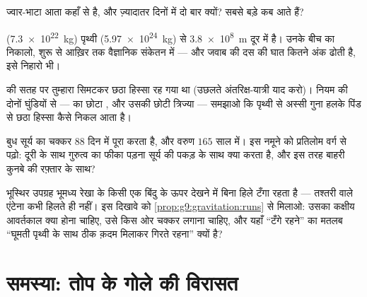 \begin{exercise}[$\star$]\label{exo:g9:gravitation:8}
ज्वार-भाटा आता कहाँ से है, और ज़्यादातर दिनों में दो बार क्यों? सबसे
बड़े कब आते हैं?
\end{exercise}

\begin{exercise}[$\star\star$]\label{exo:g9:gravitation:9}
 (\qty{7.3e22}{kg}) पृथ्वी (\qty{5.97e24}{kg}) से
\qty{3.8e8}{m} दूर  में है। उनके बीच का  निकालो, शुरू से
आख़िर तक वैज्ञानिक संकेतन में --- और जवाब की दस की घात कितने अंक ढोती
है, इसे निहारो भी।
\end{exercise}

\begin{exercise}[$\star\star$]\label{exo:g9:gravitation:10}
 की सतह पर तुम्हारा  सिमटकर छठा हिस्सा रह गया था (उछलते
अंतरिक्ष-यात्री याद करो)। नियम की दोनों घुंडियों से ---  का
छोटा , और उसकी छोटी त्रिज्या --- समझाओ कि पृथ्वी से अस्सी
गुना हलके पिंड से छठा हिस्सा कैसे निकल आता है।
\end{exercise}

\begin{exercise}[$\star\star$]\label{exo:g9:gravitation:11}
बुध सूर्य का चक्कर $88$ दिन में पूरा करता है, और वरुण $165$ साल में।
इस नमूने को प्रतिलोम वर्ग से पढ़ो: दूरी के साथ गुरुत्व का फीका पड़ना
सूर्य की पकड़ के साथ क्या करता है, और इस तरह बाहरी कुनबे की रफ़्तार के
साथ?
\end{exercise}

\begin{exercise}[$\star\star\star$]\label{exo:g9:gravitation:12}
भूस्थिर उपग्रह भूमध्य रेखा के किसी एक बिंदु के ऊपर देखने में बिना हिले
टँगा रहता है --- तश्तरी वाले एंटेना कभी हिलते ही नहीं। इस दिखावे को
\cref{prop:g9:gravitation:runs} से मिलाओ: उसका कक्षीय आवर्तकाल क्या
होना चाहिए, उसे किस ओर चक्कर लगाना चाहिए, और यहाँ ``टँगे रहने'' का
मतलब ``घूमती पृथ्वी के साथ ठीक क़दम मिलाकर गिरते रहना'' क्यों है?
\end{exercise}

\section{समस्या: तोप के गोले की विरासत}

